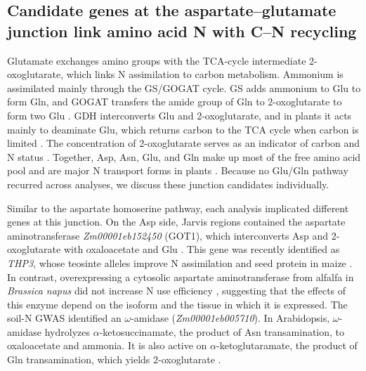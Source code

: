 \documentclass[namedate,unnumsec,webpdf,contemporary,large]{oup-authoring-template}
\begin{document}
\subsection{Candidate genes at the aspartate--glutamate junction link amino acid N with C--N recycling}

Glutamate exchanges amino groups with the TCA-cycle intermediate 2-oxoglutarate, which links N assimilation to carbon metabolism. Ammonium is assimilated mainly through the GS/GOGAT cycle. GS adds ammonium to Glu to form Gln, and GOGAT transfers the amide group of Gln to 2-oxoglutarate to form two Glu \citep{Hodges2002TwoOxoglutarate,MasclauxDaubresse2010NUE}. GDH interconverts Glu and 2-oxoglutarate, and in plants it acts mainly to deaminate Glu, which returns carbon to the TCA cycle when carbon is limited \citep{Miyashita2008GDH}. The concentration of 2-oxoglutarate serves as an indicator of carbon and N status \citep{Huergo2015TwoOG}. Together, Asp, Asn, Glu, and Gln make up most of the free amino acid pool and are major N transport forms in plants \citep{McAllister2016AAT}. Because no Glu/Gln pathway recurred across analyses, we discuss these junction candidates individually.

Similar to the aspartate homoserine pathway, each analysis implicated different genes at this junction. On the Asp side, Jarvis regions contained the aspartate aminotransferase \textit{Zm00001eb152450} (GOT1), which interconverts Asp and 2-oxoglutarate with oxaloacetate and Glu \citep{Han2021Aspartate, Zhou2009AspAT}. This gene was recently identified as \textit{THP3}, whose teosinte alleles improve N assimilation and seed protein in maize \citep{Huang2026THP3}. In contrast, overexpressing a cytosolic aspartate aminotransferase from alfalfa in \textit{Brassica napus} did not increase N use efficiency \citep{McAllister2016AAT}, suggesting that the effects of this enzyme depend on the isoform and the tissue in which it is expressed. The soil-N GWAS identified an $\omega$-amidase (\textit{Zm00001eb005710}). In Arabidopsis, $\omega$-amidase hydrolyzes $\alpha$-ketosuccinamate, the product of Asn transamination, to oxaloacetate and ammonia. It is also active on $\alpha$-ketoglutaramate, the product of Gln transamination, which yields 2-oxoglutarate \citep{Zhang2014OmegaAmidase}.
\end{document}
